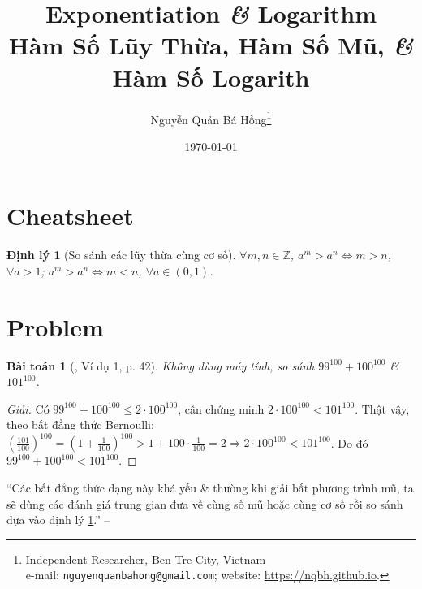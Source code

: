 \documentclass{article}
\title{Exponentiation \textit{\&} Logarithm\\Hàm Số Lũy Thừa, Hàm Số Mũ, \textit{\&} Hàm Số Logarith}
\author{Nguyễn Quản Bá Hồng\footnote{Independent Researcher, Ben Tre City, Vietnam\\e-mail: \texttt{nguyenquanbahong@gmail.com}; website: \url{https://nqbh.github.io}.}}
\date{\today}
\numberwithin{equation}{section}
\newtheorem{baitoan}{Bài toán}[section]
\newtheorem{dinhly}{Định lý}[section]
\begin{document}
\maketitle
\begin{abstract}
	
\end{abstract}
\setcounter{secnumdepth}{4}
\setcounter{tocdepth}{3}
\tableofcontents
\newpage


\section{Cheatsheet}

\begin{dinhly}[So sánh các lũy thừa cùng cơ số]
	\label{thm: so sanh luy thua cung co so}
	$\forall m,n\in\mathbb{Z}$, $a^m > a^n\Leftrightarrow m > n$, $\forall a > 1$; $a^m > a^n\Leftrightarrow m < n$, $\forall a\in(0,1)$.
\end{dinhly}


\section{Problem}

\begin{baitoan}[\cite{TL_chuyen_Toan_Giai_Tich_12}, Ví dụ 1, p. 42]
	Không dùng máy tính, so sánh $99^{100} + 100^{100}$ \& $101^{100}$.
\end{baitoan}

\begin{proof}[Giải]
	Có $99^{100} + 100^{100}\le 2\cdot 100^{100}$, cần chứng minh $2\cdot 100^{100} < 101^{100}$. Thật vậy, theo bất đẳng thức Bernoulli: $\left(\frac{101}{100}\right)^{100} = \left(1 + \frac{1}{100}\right)^{100} > 1 + 100\cdot\frac{1}{100} = 2\Rightarrow 2\cdot 100^{100} < 101^{100}$. Do đó $99^{100} + 100^{100} < 101^{100}$.
\end{proof}
``Các bất đẳng thức dạng này khá yếu \& thường khi giải bất phương trình mũ, ta sẽ dùng các đánh giá trung gian đưa về cùng số mũ hoặc cùng cơ số rồi so sánh dựa vào định lý \ref{thm: so sanh luy thua cung co so}.'' -- \cite[p. 42]{TL_chuyen_Toan_Giai_Tich_12}
\end{document}
